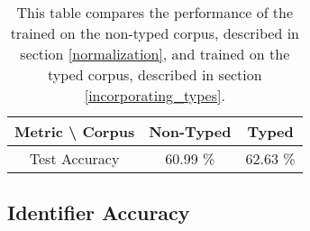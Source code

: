 \documentclass[11pt]{article}
\begin{document}
\begin{table}
\centering
	\begin{tabular}{c | c | c }
		Metric \textbackslash{} Corpus & Non-Typed & Typed \\\hline
		Test Accuracy & 60.99 \% & 62.63 \%
	\end{tabular}
\caption{This table compares the performance of the \spn trained on the non-typed corpus, described in section \ref{normalization}, and trained on the typed corpus, described in section \ref{incorporating_types}.}
\label{typed_exp}
\end{table}

\subsection{Identifier Accuracy}
\end{document}
